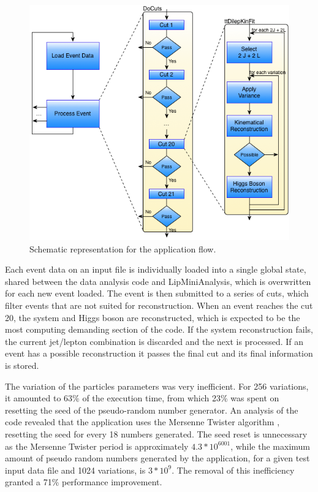 \begin{figure}[!htp]
	\begin{center}
		\includegraphics[scale=0.5]{imgs/graf_abstract_flow_with_kinfit.png}
		\caption{Schematic representation for the \tth application flow.}
		\label{fig:flow}
	\end{center}
\end{figure}

Each event data on an input file is individually loaded into a single global state, shared between the data analysis code and LipMiniAnalysis, which is overwritten for each new event loaded. The event is then submitted to a series of cuts, which filter events that are not suited for reconstruction. When an event reaches the cut 20, the \ttbar system and Higgs boson are reconstructed, which is expected to be the most computing demanding section of the code. If the \ttbar system reconstruction fails, the current jet/lepton combination is discarded and the next is processed. If an event has a possible reconstruction it passes the final cut and its final information is stored.

The variation of the particles parameters was very inefficient. For 256 variations, it amounted to 63\% of the \tth execution time, from which 23\% was spent on resetting the seed of the pseudo-random number generator. An analysis of the code revealed that the application uses the Mersenne Twister algorithm \cite{MersenneTwister}, resetting the seed for every 18 numbers generated. The seed reset is unnecessary as the Mersenne Twister period is approximately $4.3 * 10^{6001}$, while the maximum amount of pseudo random numbers generated by the application, for a given test input data file and 1024 variations, is $3 * 10^9$. The removal of this inefficiency granted a 71\% performance improvement.

